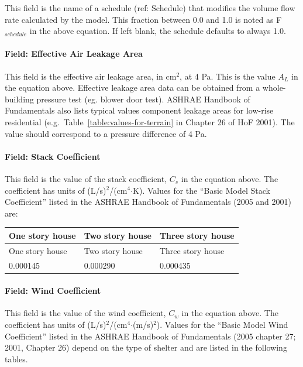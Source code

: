 This field is the name of a schedule (ref: Schedule) that modifies the volume flow rate calculated by the model. This fraction between 0.0 and 1.0 is noted as F\(_{schedule}\) in the above equation. If left blank, the schedule defaults to always 1.0.

\paragraph{Field: Effective Air Leakage Area}\label{field-effective-air-leakage-area}

This field is the effective air leakage area, in cm\(^{2}\), at 4 Pa. This is the value \({A_L}\) in the equation above. Effective leakage area data can be obtained from a whole-building pressure test (eg. blower door test). ASHRAE Handbook of Fundamentals also lists typical values component leakage areas for low-rise residential (e.g.~Table~\ref{table:values-for-terrain} in Chapter 26 of HoF 2001). The value should correspond to a pressure difference of 4 Pa.

\paragraph{Field: Stack Coefficient}\label{field-stack-coefficient}

This field is the value of the stack coefficient, \({C_s}\) in the equation above. The coefficient has units of (L/s)\(^{2}\)/(cm\(^{4}\)$\cdot$K). Values for the ``Basic Model Stack Coefficient'' listed in the ASHRAE Handbook of Fundamentals (2005 and 2001) are:

\begin{longtable}[c]{@{}lll@{}}
\toprule
One story house & Two story house & Three story house \tabularnewline
\midrule
\endfirsthead

\toprule
One story house & Two story house & Three story house \tabularnewline
\midrule
\endhead

0.000145 & 0.000290 & 0.000435 \tabularnewline
\bottomrule
\end{longtable}

\paragraph{Field: Wind Coefficient}\label{field-wind-coefficient}

This field is the value of the wind coefficient, \({C_w}\) in the equation above. The coefficient has units of (L/s)\(^{2}\)/(cm\(^{4}\)$\cdot$(m/s)\(^{2}\)). Values for the ``Basic Model Wind Coefficient'' listed in the ASHRAE Handbook of Fundamentals (2005 chapter 27; 2001, Chapter 26) depend on the type of shelter and are listed in the following tables.

